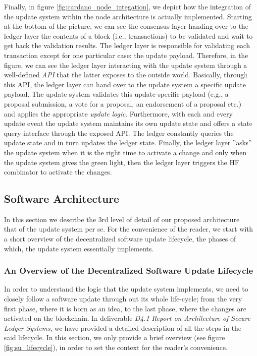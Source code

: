 Finally, in figure \ref{fig:cardano_node_integation}, we depict how the 
integration of the update system within the node architecture is actually 
implemented. Starting at the bottom of the picture, we can see the consensus 
layer handing over to the ledger layer the contents of a block (i.e., 
transactions) to be validated and wait to get back the validation results. The 
ledger layer is responsible for validating each transaction except for one 
particular case: the update payload. Therefore, in the figure, we can see the 
ledger layer interacting with the update system through a well-defined 
\emph{API} that the latter exposes to the outside world. Basically, 
through this API, the ledger layer can hand over to the update system a 
specific update payload. The update system validates this update-specific 
payload (e.g., a proposal submission, a vote for a proposal, an endorsement of 
a proposal etc.) and applies the appropriate \emph{update logic}. Furthermore, 
with each and every update event the update system maintains its own update 
state and offers a state query interface through the exposed API. The ledger 
constantly queries the update state and in turn updates the ledger state. 
Finally, the ledger layer ''asks'' the update system when it is the right time 
to activate a change and only when the update system gives the green light, 
then the ledger layer triggers the HF combinator to activate the changes.


\subsection{Software Architecture} \label{software_architecture}
In this section we describe the 3rd level of detail of our proposed 
architecture that of the update system per se. For the convenience of the 
reader, we start with a short overview of the decentralized software update 
lifecycle, the phases of which, the update system essentially implements.

\subsubsection{An Overview of the Decentralized Software Update
	Lifecycle}\label{sec:su_lifecycle}
In order to understand the logic that the update system implements, we need to 
closely follow a software
update through out its whole life-cycle; from the very first phase, where it is
born as an idea, to the last phase, where the changes are activated on the
blockchain. In deliverable \emph{D4.1 Report on Architecture of Secure Ledger
	Systems}, we have provided a detailed description of all the steps in the 
said
lifecycle. In this section, we only provide a brief overview (see figure
\ref{fig:su_lifecycle}), in order to set the context for the reader's
convenience.

